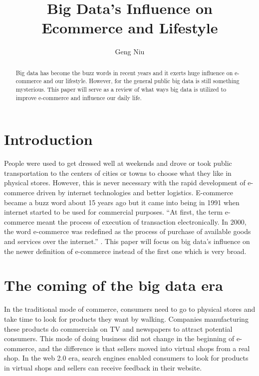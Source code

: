 \documentclass[sigconf]{acmart}
\begin{document}
\title{Big Data's Influence on Ecommerce and Lifestyle}


\author{Geng Niu}



\begin{abstract}
Big data has become the buzz words in recent years and it exerts huge influence on e-commerce and our lifestyle. However, for the general public big data is still something mysterious. This paper will serve as a review of what ways big data is utilized to improve e-commerce and influence our daily life.
\end{abstract}



\maketitle

\section{Introduction}
People were used to get dressed well at weekends and drove or took public transportation to the centers of cities or towns to choose what they like in physical stores. However, this is never necessary with the rapid development of e-commerce driven by internet technologies and better logistics.  E-commerce became a buzz word about 15 years ago but it came into being in 1991 when internet started to be used for commercial purposes. ``At first, the term e-commerce meant the process of execution of transaction electronically. In 2000, the word e-commerce was redefined as the process of purchase of available goods and services over the internet.'' \cite{HistoryofEcommerce}. This paper will focus on big data’s influence on the newer definition of e-commerce instead of the first one which is very broad.
\section{The coming of the big data era}
In the traditional mode of commerce, consumers need to go to physical stores and take time to look for products they want by walking. Companies manufacturing these products do commercials on TV and newspapers to attract potential consumers. This mode of doing business did not change in the beginning of e-commerce, and the difference is that sellers moved into virtual shops from a real shop. In the web 2.0 era, search engines enabled consumers to look for products in virtual shops and sellers can receive feedback in their website\cite{Chen2012}.
\end{document}
